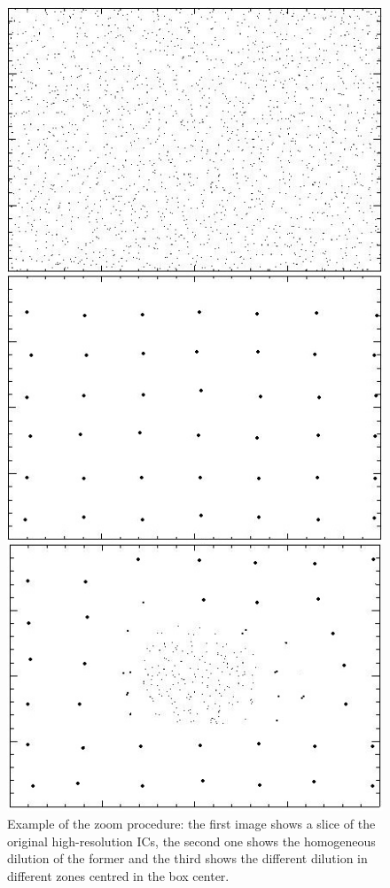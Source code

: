 \documentclass[11pt,a4paper,titlepage]{article}
\begin{document}
\begin{figure}[!tb]
\centering
\includegraphics[height=0.4\textheight]{Zoom_comparison_tot.jpg}
\caption{Example of the zoom procedure: the first image shows a slice of the original high-resolution ICs, the second one shows the homogeneous dilution of the former and the third shows the different dilution in different zones centred in the box center.}
\label{Zoom_comparison}
\end{figure}
\end{document}
